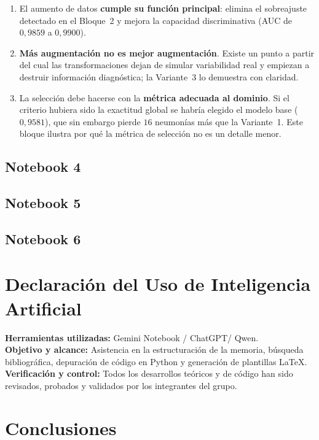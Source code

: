 \documentclass[11pt, a4paper]{article}
\numberwithin{equation}{section}
\begin{document}
\begin{enumerate}
    \item El aumento de datos \textbf{cumple su función principal}: elimina el
    sobreajuste detectado en el Bloque~2 y mejora la capacidad discriminativa
    (AUC de $0{,}9859$ a $0{,}9900$).
    \item \textbf{Más augmentación no es mejor augmentación}. Existe un punto a partir
    del cual las transformaciones dejan de simular variabilidad real y empiezan a
    destruir información diagnóstica; la Variante~3 lo demuestra con claridad.
    \item La selección debe hacerse con la \textbf{métrica adecuada al dominio}. Si el
    criterio hubiera sido la exactitud global se habría elegido el modelo base
    ($0{,}9581$), que sin embargo pierde $16$ neumonías más que la Variante~1. Este
    bloque ilustra por qué la métrica de selección no es un detalle menor.
\end{enumerate}
\newpage
\subsection{Notebook 4}
\newpage
\subsection{Notebook 5}
\newpage
\subsection{Notebook 6}

\newpage
\section{Declaración del Uso de Inteligencia Artificial}

\noindent
\textbf{Herramientas utilizadas:} Gemini Notebook / ChatGPT/ Qwen.\\[0.1cm]
\textbf{Objetivo y alcance:} Asistencia en la estructuración de la memoria, búsqueda bibliográfica, depuración de código en Python y generación de plantillas LaTeX.\\[0.1cm]
\textbf{Verificación y control:} Todos los desarrollos teóricos y de código han sido revisados, probados y validados por los integrantes del grupo.

\newpage
\section{Conclusiones}
\end{document}
